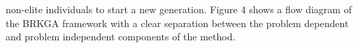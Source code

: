 \begin{multicols}{2}
non-\allowbreak{}elite individuals to start a new generation.\allowbreak{} Figure 4 shows a flow diagram of the BRKGA framework with a clear separation between the problem dependent and problem independent components of the method.\allowbreak{}
\par
{
}
\par

\end{multicols}
